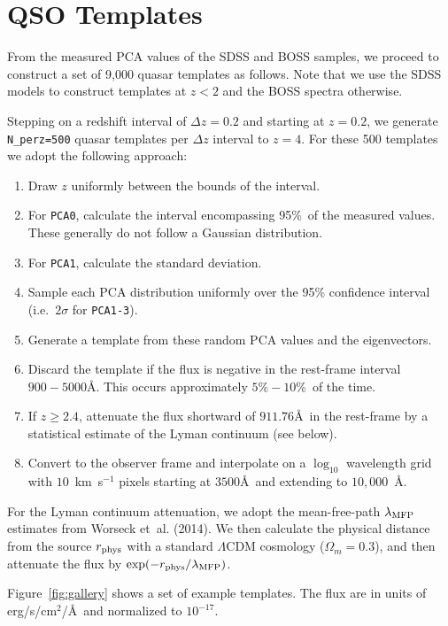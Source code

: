 \documentclass[11pt]{article}
\begin{document}
\section{QSO Templates}\label{sec:templ}

From the measured PCA values of the SDSS and BOSS samples, we proceed
to construct a set of 9,000 quasar templates as follows.  Note that we
use the SDSS models to construct templates at $z<2$ and the BOSS
spectra otherwise.

Stepping on a redshift interval of $\Delta z = 0.2$ and starting at
$z=0.2$, we generate {\tt N\_perz=500} quasar templates per $\Delta z$
interval to $z=4$.  For
these 500 templates we adopt the following approach:

\begin{enumerate}
\item Draw $z$ uniformly between the bounds of the interval.
\item For {\tt PCA0}, calculate the interval encompassing 95\%\ of the
  measured values.  These generally do not follow a Gaussian
  distribution.
\item For {\tt PCA1}, calculate the standard deviation.
\item Sample each PCA distribution uniformly over the 95\% confidence
  interval (i.e.\ $2 \sigma$ for {\tt PCA1-3}).
\item Generate a template from these random PCA values and the
  eigenvectors. 
\item Discard the template if the flux is negative in the rest-frame
  interval $900-5000$\AA.  This occurs approximately $5\%-10$\%\ of
  the time.
\item If $z \ge 2.4$, attenuate the flux shortward of $911.76$\AA\ in
  the rest-frame by a statistical estimate of the Lyman continuum (see
  below).
\item Convert to the observer frame and interpolate on a $\log_{10}$
  wavelength grid with $10$~km~s$^{-1}$ pixels starting at
  $3500$\AA\ and extending to $10,000$~\AA.
\end{enumerate}

For the Lyman continuum attenuation, we adopt the mean-free-path
$\lambda_{\rm MFP}$ estimates from Worseck et~al. (2014).
We then calculate the physical distance from the source $r_{\rm phys}$
with a standard $\Lambda$CDM cosmology ($\Omega_m = 0.3$), and then
attenuate the flux by $\exp(-r_{\rm phys} / \lambda_{\rm MFP})$. 

Figure~\ref{fig:gallery} shows a set of example templates.
The flux are in units of erg/s/cm$^2$/\AA\ and 
normalized to $10^{-17}$.
\end{document}
